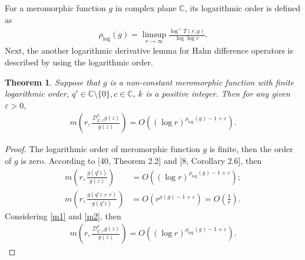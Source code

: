 \documentclass[sn-mathphys-num]{sn-jnl}%
\theoremstyle{thmstyleone}%
\newtheorem{theorem}{Theorem}%
\theoremstyle{thmstyletwo}%
\theoremstyle{thmstylethree}%
\begin{document}
\indent For a meromorphic function \(g\) in complex plane \(\mathbb{C}\), its logarithmic order is defined as
\begin{align*}
	\rho_{\log}(g)=\limsup\limits_{r \to \infty}	\frac{\log^{+}T(r,g)}{\log \log r}.
\end{align*}
\indent Next, the another logarithmic derivative lemma for Hahn difference operators is described by using the logarithmic order.
\begin{theorem}\label{l5.1}
	Suppose that \(g\) is a non-constant meromorphic function with finite logarithmic order, \(q'\in\mathbb{C}\setminus\{0\}, c\in\mathbb{C}\), \(k\) is a positive integer. Then for any given \(\varepsilon>0\),
	\begin{align*}
		m\left(r,\frac{\mathcal{D}_{q',c}^{k}g(z)}{g(z)}\right)=O((\log r)^{\rho_{\log}(g)-1+\varepsilon}).
	\end{align*}
\end{theorem}
\begin{proof}
	The logarithmic order of meromorphic function \(g\) is finite, then the order of \(g\) is zero. According to [40, Theorem 2.2] and [8, Corollary 2.6], then
	\begin{align*}
		m\left(r,\frac{g(q'z)}{g(z)}\right)&=O((\log r)^{\rho_{\log}(g)-1+\varepsilon});\\
		m\left(r,\frac{g(q'z+c)}{g(q'z)}\right)&=O(r^{\rho(g)-1+\varepsilon})=O(\frac{1}{r}).
	\end{align*}	
	\indent Considering \eqref{m1} and \eqref{m2}, then
	\begin{align*}
		m\left(r,\frac{\mathcal{D}_{q',c}^{k}g(z)}{g(z)}\right)= O((\log r)^{\rho_{\log}(g)-1+\varepsilon}).
	\end{align*}
\end{proof}
\end{document}
